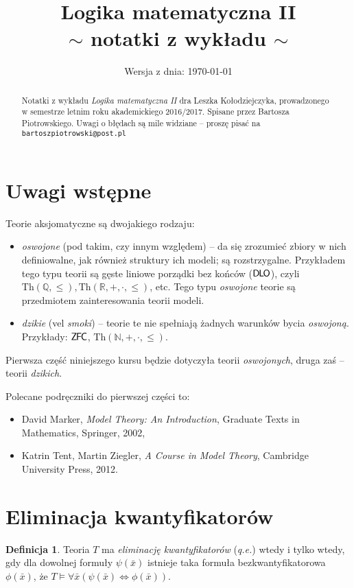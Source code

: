 \documentclass{article}
\title{\textbf{Logika matematyczna II} \\ \Large{$\sim$ notatki z wykładu $\sim$}}
\date{\small{Wersja z dnia: \today}}
\newcommand{\N}{\mathbb{N}}
\newcommand{\Q}{\mathbb{Q}}
\newcommand{\R}{\mathbb{R}}
\theoremstyle{plain}
\theoremstyle{definition}
\newtheorem{df}[thm]{Definicja}
\theoremstyle{remark}
\newcommand{\ZFC}{\mathsf{Z \mkern-1.6mu F \mkern-1.5mu C}}
\newcommand{\DLO}{\mathsf{D \mkern-1.5mu L \mkern-1.8mu O}}
\newcommand{\wtw}{wtedy i tylko wtedy, gdy }
\newcommand{\Th}{\text{Th}}
\begin{document}
\maketitle

\begin{abstract}
	Notatki z wykładu \textit{Logika matematyczna II} dra Leszka
	Kołodziejczyka, prowadzonego w semestrze letnim roku akademickiego
	2016/2017. Spisane przez Bartosza Piotrowskiego. Uwagi o błędach są
	mile widziane -- proszę pisać na \texttt{bartoszpiotrowski@post.pl}
\end{abstract}


\section*{Uwagi wstępne}
Teorie aksjomatyczne są dwojakiego rodzaju:
\begin{itemize} %
	\item \textit{oswojone} (pod takim, czy innym względem) -- da się
		zrozumieć zbiory w nich definiowalne, jak również struktury ich
		modeli; są rozstrzygalne. Przykładem tego typu teorii są gęste
		liniowe porządki bez końców ($\DLO$), czyli $\Th(\Q, \leq),
		\Th(\R, +, \cdot, \leq)$, etc. Tego typu \textit{oswojone}
		teorie są przedmiotem zainteresowania teorii modeli.
	\item \textit{dzikie} (vel \textit{smoki}) -- teorie te nie spełniają
		żadnych warunków bycia \textit{oswojoną}. Przykłady: $\ZFC$,
		$\Th(\N, +, \cdot, \leq)$.
\end{itemize}
Pierwsza część niniejszego kursu będzie dotyczyła teorii \textit{oswojonych},
druga zaś -- teorii \textit{dzikich}.

Polecane podręczniki do pierwszej części to:
\begin{itemize}
	\item David Marker, \textit{Model Theory: An Introduction}, Graduate
		Texts in Mathematics, Springer, 2002,
	\item Katrin Tent, Martin Ziegler, \textit{A Course in Model Theory},
		Cambridge University Press, 2012.
\end{itemize}

\section{Eliminacja kwantyfikatorów}
\begin{df}
	Teoria $T$ ma \textit{eliminację kwantyfikatorów} (\textit{q.e.}) \wtw dla
	dowolnej formuły $\psi(\bar{x})$ istnieje taka formuła
	bezkwantyfikatorowa $\phi(\bar{x})$, że $T \models \forall {\bar{x}}
	(\psi(\bar{x}) \iff \phi(\bar{x}))$.
\end{df}
\end{document}
